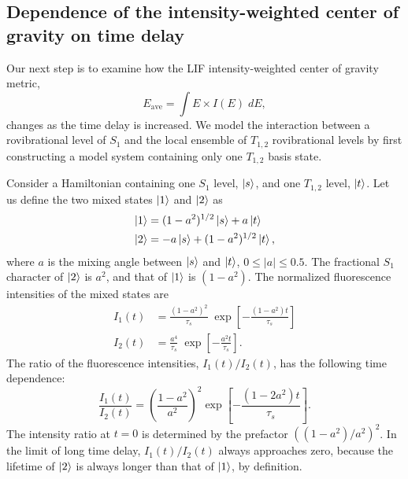 \subsection{Dependence of the intensity-weighted center of gravity on
  time delay}

Our next step is to examine how the LIF intensity-weighted center of
gravity metric,
\begin{equation}
  \label{eq:ch5-cog-def}
  E_{\text{ave}} = \int E \times I(E) \; dE,
\end{equation}
changes as the time delay is increased.  We model the interaction
between a rovibrational level of $S_1$ and the local ensemble of
$T_{1,2}$ rovibrational levels by first constructing a model system
containing only one $T_{1,2}$ basis state.


Consider a Hamiltonian containing one $S_1$ level, $\mathinner{|{s}\rangle}$, and one
$T_{1,2}$ level, $\mathinner{|{t}\rangle}$.  Let us define the two mixed states
$\mathinner{|{1}\rangle}$ and $\mathinner{|{2}\rangle}$ as
\begin{equation}
  \begin{split}
    \mathinner{|{1}\rangle} &=  (1 - a^2)^{1/2} \mathinner{|{s}\rangle} + a \mathinner{|{t}\rangle}\\
    \mathinner{|{2}\rangle} &= -a \mathinner{|{s}\rangle} + (1 - a^2)^{1/2} \mathinner{|{t}\rangle},
  \end{split}
\end{equation}
where $a$ is the mixing angle between $\mathinner{|{s}\rangle}$ and $\mathinner{|{t}\rangle}$, $0 \leq
\lvert a \rvert \leq 0.5$.  The fractional $S_1$ character of
$\mathinner{|{2}\rangle}$ is $a^2$, and that of $\mathinner{|{1}\rangle}$ is $(1 - a^2)$.  The
normalized fluorescence intensities of the mixed states are
\begin{equation}
  \begin{split}
    I_1(t) &= \frac{(1 - a^2)^2}{\tau_s} \; \exp 
          \left[
            - \frac{(1 - a^2) t}{\tau_s}
          \right]\\
    I_2(t) &= \frac{a^4}{\tau_s} \; \exp 
          \left[
            - \frac{a^2 t}{\tau_s}
          \right].
  \end{split}
\end{equation}
The ratio of the fluorescence intensities, $I_1(t)/I_2(t)$, has the
following time dependence:
\begin{equation}
  \frac{I_1(t)}{I_2(t)} = 
  \left(
    \frac{1 - a^2}{a^2}
  \right)^2
  \exp
  \left[
    - \frac{(1 - 2a^2) t}{\tau_s}
  \right].
\end{equation}  
The intensity ratio at $t=0$ is determined by the prefactor $( (1 -
a^2)/a^2 )^2$.  In the limit of long time delay, $I_1(t)/I_2(t)$
always approaches zero, because the lifetime of $\mathinner{|{2}\rangle}$ is always
longer than that of $\mathinner{|{1}\rangle}$, by definition.  

